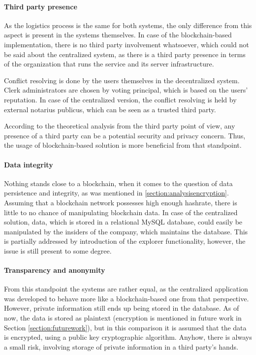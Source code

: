 \paragraph{Third party presence}
As the logistics process is the same for both systems, the only difference from this aspect is present in the systems themselves. In case of the blockchain-based implementation, there is no third party involvement whatsoever, which could not be said about the centralized system, as there is a third party presence in terms of the organization that runs the service and its server infrastructure. 

Conflict resolving is done by the users themselves in the decentralized system. Clerk administrators are chosen by voting principal, which is based on the users' reputation. In case of the centralized version, the conflict resolving is held by external notarius publicus, which can be seen as a trusted third party.

According to the theoretical analysis from the third party point of view, any presence of a third party can be a potential security and privacy concern. Thus, the usage of blockchain-based solution is more beneficial from that standpoint.

\paragraph{Data integrity}
Nothing stands close to a blockchain, when it comes to the question of data persistence and integrity, as was mentioned in \ref{section:analysisencryption}. Assuming that a blockchain network possesses high enough hashrate, there is little to no chance of manipulating blockchain data. In case of the centralized solution, data, which is stored in a relational MySQL database, could easily be manipulated by the insiders of the company, which maintains the database. This is partially addressed by introduction of the explorer functionality, however, the issue is still present to some degree.

\paragraph{Transparency and anonymity}
From this standpoint the systems are rather equal, as the centralized application was developed to behave more like a blockchain-based one from that perspective. However, private information still ends up being stored in the database. As of now, the data is stored as plaintext (encryption is mentioned in future work in Section \ref{section:futurework}), but in this comparison it is assumed that the data is encrypted, using a public key cryptographic algorithm. Anyhow, there is always a small risk, involving storage of private information in a third party's hands.

